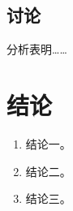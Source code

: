 \documentclass[12pt,a4paper]{swuthesis}
\begin{document}
\subsection{讨论}
分析表明……

\newpage
\section{结论}

\begin{enumerate}
    \item 结论一。
    \item 结论二。
    \item 结论三。
\end{enumerate}

\makereference


\end{document}
